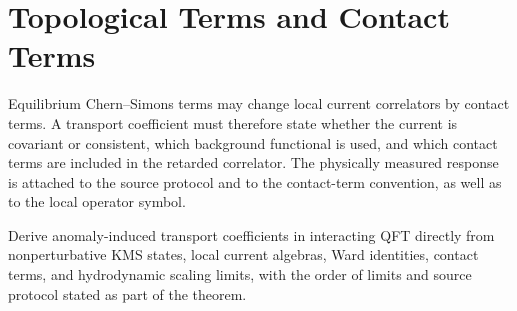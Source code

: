 \section{Topological Terms and Contact Terms}

Equilibrium Chern--Simons terms may change local current correlators by
contact terms.  A transport coefficient must therefore state whether the
current is covariant or consistent, which background functional is used, and
which contact terms are included in the retarded correlator.  The physically
measured response is attached to the source protocol and to the contact-term
convention, as well as to the local operator symbol.

\begin{openproblem}
\label{op:nonperturbative-anomalous-transport}
Derive anomaly-induced transport coefficients in interacting QFT directly
from nonperturbative KMS states, local current algebras, Ward identities,
contact terms, and hydrodynamic scaling limits, with the order of limits and
source protocol stated as part of the theorem.
\end{openproblem}
